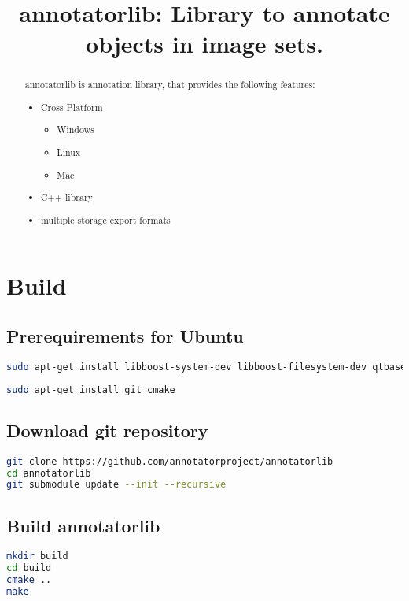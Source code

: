 \documentclass{article}
\begin{document}
\title{annotatorlib: Library to annotate objects in image sets.}

\maketitle

\begin{abstract}
\noindent
annotatorlib is annotation library, that provides the following features:

\begin{itemize}
  \item Cross Platform
  \begin{itemize}
    \item Windows
    \item Linux
    \item Mac
  \end{itemize}
  \item C++ library
  \item multiple storage export formats
\end{itemize}

\end{abstract}

\setcounter{tocdepth}{2}
\tableofcontents

\newpage
\section{Build}
\subsection{Prerequirements for Ubuntu}
\begin{lstlisting}[language=bash,caption={requrired libraries}]
sudo apt-get install libboost-system-dev libboost-filesystem-dev qtbase5-dev
\end{lstlisting}
\begin{lstlisting}[language=bash,caption={requrired applications}]
sudo apt-get install git cmake
\end{lstlisting}

\subsection{Download git repository}
\begin{lstlisting}[language=bash,caption={git}]
git clone https://github.com/annotatorproject/annotatorlib
cd annotatorlib
git submodule update --init --recursive
\end{lstlisting}

\subsection{Build annotatorlib}
\begin{lstlisting}[language=bash,caption={build}]
mkdir build
cd build
cmake ..
make
\end{lstlisting}
\end{document}
